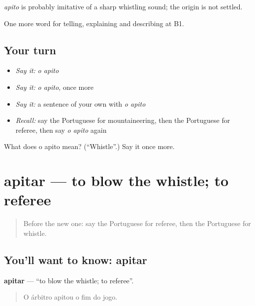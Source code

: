 \begin{cousinweb}
\emph{apito} is probably imitative of a sharp whistling sound; the origin is not settled.
\end{cousinweb}

\begin{grammarlens}[title={What you've built}]
One more word for telling, explaining and describing at B1.
\end{grammarlens}

\subsection*{Your turn}
\begin{itemize}
\raggedright
  \item \emph{Say it:} \emph{o apito}
  \item \emph{Say it:} \emph{o apito}, once more
  \item \emph{Say it:} a sentence of your own with \emph{o apito}
  \item \emph{Recall:} say the Portuguese for mountaineering, then the Portuguese for referee, then say \emph{o apito} again
\end{itemize}

\begin{tcolorbox}[breakable,colback=teal!4,colframe=teal!35!black,title={Before you move on}]
What does o apito mean? (\textquotedblleft{}Whistle\textquotedblright{}.) Say it once more.
\end{tcolorbox}
\section[apitar]{apitar — to blow the whistle; to referee}

\label{lesson:PT-C508-apitar}



\begin{quote}
Before the new one: say the Portuguese for referee, then the Portuguese for whistle.
\end{quote}

\subsection*{You'll want to know: apitar}
\textbf{apitar} — \textquotedblleft{}to blow the whistle; to referee\textquotedblright{}.

\begin{quote}
O árbitro apitou o fim do jogo.
\end{quote}

